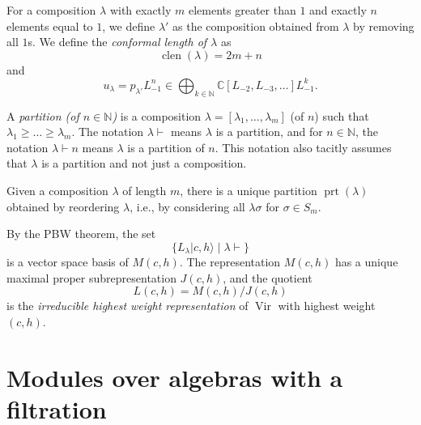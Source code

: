\documentclass[a4paper, 12pt, reqno]{amsart}
\theoremstyle{remark}
\DeclareMathOperator{\Vir}{Vir}
\DeclareMathOperator{\clen}{clen}
\DeclareMathOperator{\prt}{prt}
\begin{document}
For a composition $\lambda$ with exactly $m$ elements greater than $1$ and exactly $n$ elements equal to $1$, we define $\lambda'$ as the composition obtained from $\lambda$ by removing all $1$s.
We define the \emph{conformal length of $\lambda$} as
\begin{equation*}
  \clen(\lambda) = 2m + n
\end{equation*}
and
\begin{equation*}
  u_{\lambda} = p_{\lambda'}L_{-1}^n \in \bigoplus_{k \in \mathbb{N}}\mathbb{C}[L_{-2}, L_{-3}, \dots]L_{-1}^k.
\end{equation*}

A \emph{partition (of $n \in \mathbb{N}$)} is a composition $\lambda = [\lambda_1, \dots, \lambda_m]$ (of $n$) such that $\lambda_1 \ge \dots \ge \lambda_m$.
The notation $\lambda \vdash$ means $\lambda$ is a partition, and for $n \in \mathbb{N}$, the notation $\lambda \vdash n$ means $\lambda$ is a partition of $n$.
This notation also tacitly assumes that $\lambda$ is a partition and not just a composition.

Given a composition $\lambda$ of length $m$, there is a unique partition $\prt(\lambda)$ obtained by reordering $\lambda$, i.e., by considering all $\lambda\sigma$ for $\sigma \in S_m$.

By the PBW theorem, the set
\begin{equation*}
  \{L_{\lambda}|c, h\rangle \mid \lambda \vdash\}
\end{equation*}
is a vector space basis of $M(c, h)$.
The representation $M(c, h)$ has a unique maximal proper subrepresentation $J(c, h)$, and the quotient
\begin{equation*}
  L(c, h) = M(c, h)/J(c, h)
\end{equation*}
is the \emph{irreducible highest weight representation} of $\Vir$ with highest weight $(c, h)$.

\section{Modules over algebras with a filtration}
\label{sec:modul-over-algebr}
\end{document}
